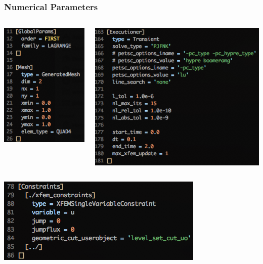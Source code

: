 \documentclass[]{beamer}
\begin{document}
\begin{frame}\frametitle{Numerical Parameters}
  	\begin{columns}
			\begin{center}
			\includegraphics[scale=0.4]{figures/2D_xy_ls1m/Screen-GlobalParams-2Dxyls1m}
			\end{center}
			\begin{center}
			\includegraphics[scale=0.4]{figures/2D_xy_ls1m/Screen-Executioner-2Dxyls1m}
			\end{center}
	\end{columns}
	\begin{center}
	\includegraphics[scale=0.4]{figures/2D_xy_ls1m/Screen-Constraints-2Dxyls1m}
	\end{center}
\end{frame}
\end{document}
